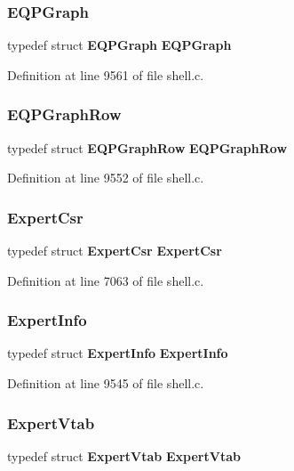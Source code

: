 \subsubsection{E\+Q\+P\+Graph}
{\footnotesize\ttfamily typedef struct \textbf{ E\+Q\+P\+Graph} \textbf{ E\+Q\+P\+Graph}}



Definition at line 9561 of file shell.\+c.

\mbox{\label{shell_8c_a7ce0800e038436fe68fa8664993b8da1}} 
\subsubsection{E\+Q\+P\+Graph\+Row}
{\footnotesize\ttfamily typedef struct \textbf{ E\+Q\+P\+Graph\+Row} \textbf{ E\+Q\+P\+Graph\+Row}}



Definition at line 9552 of file shell.\+c.

\mbox{\label{shell_8c_a6b720f72855401ab1a213f136e2c77a7}} 
\subsubsection{Expert\+Csr}
{\footnotesize\ttfamily typedef struct \textbf{ Expert\+Csr} \textbf{ Expert\+Csr}}



Definition at line 7063 of file shell.\+c.

\mbox{\label{shell_8c_af20bd768a852d057b9e5359a228db046}} 
\subsubsection{Expert\+Info}
{\footnotesize\ttfamily typedef struct \textbf{ Expert\+Info} \textbf{ Expert\+Info}}



Definition at line 9545 of file shell.\+c.

\mbox{\label{shell_8c_a1445a8721a8ac10a98ab182fcd69075b}} 
\subsubsection{Expert\+Vtab}
{\footnotesize\ttfamily typedef struct \textbf{ Expert\+Vtab} \textbf{ Expert\+Vtab}}



